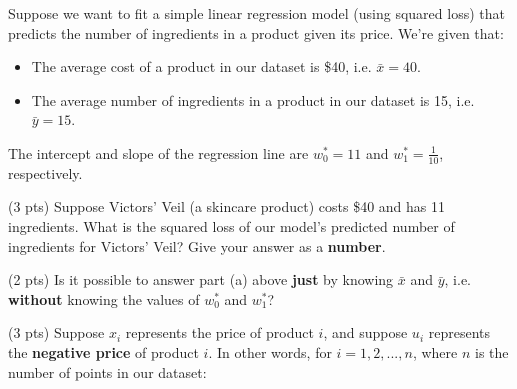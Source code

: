 \documentclass[twoside,12pt]{article}
\begin{document}
\begin{probset}
\begin{prob}[(13 pts)]
\end{prob}

\newpage

\begin{prob}[(8 pts)]

Suppose we want to fit a simple linear regression model (using squared loss) that predicts the number of ingredients in a product given its price. We're given that:

\begin{itemize}
    \item The average cost of a product in our dataset is \$40, i.e. $\bar x = 40$.
    \item The average number of ingredients in a product in our dataset is 15, i.e. $\bar y = 15$.
\end{itemize}

The intercept and slope of the regression line are $w_0^* = 11$ and $w_1^* = \frac{1}{10}$, respectively.

\begin{subprobset}

\begin{subprob}(3 pts) Suppose Victors' Veil (a skincare product) costs \$40 and has 11 ingredients. What is the squared loss of our model's predicted number of ingredients for Victors' Veil? Give your answer as a \textbf{number}.

\inlineresponsebox[1.5in]{}

\end{subprob}

\vspace{0.25in}

\begin{subprob}(2 pts) Is it possible to answer part (a) above \textbf{just} by knowing $\bar x$ and $\bar y$, i.e. \textbf{without} knowing the values of $w_0^*$ and $w_1^*$?



\end{subprob}

\vspace{0.25in}

\begin{subprob}(3 pts) Suppose $x_i$ represents the price of product $i$, and suppose $u_i$ represents the \textbf{negative price} of product $i$. In other words, for $i = 1, 2, ..., n$, where $n$ is the number of points in our dataset:


\end{subprob}
\end{subprobset}
\end{prob}
\end{probset}
\end{document}
